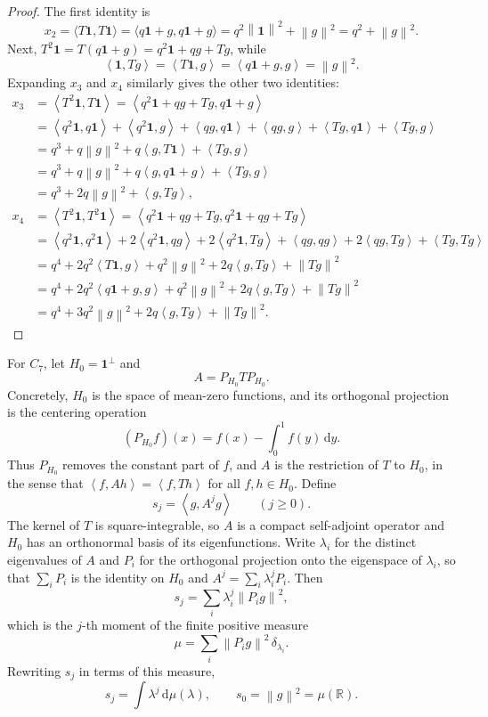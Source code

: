 \documentclass[11pt]{article}
\numberwithin{equation}{section}
\newcommand{\one}{\mathbf 1}
\newcommand{\R}{\mathbb R}
\newcommand{\ip}[2]{\left\langle #1,#2\right\rangle}
\newcommand{\norm}[1]{\left\lVert #1\right\rVert}
\newcommand{\dd}{\,\mathrm d}
\begin{document}
\begin{proof}
  The first identity is 
  \[
    x_2 = \langle T\one, T\one\rangle = \langle q\one + g, q\one + g\rangle = q^2 \norm{\one}^2 + \norm{g}^2 = q^2 + \norm{g}^2.
  \]
  Next,
  $T^2\one=T(q \one + g) = q^2\one + qg + Tg$, while
  \[
    \ip{\one}{Tg}=\ip{T\one}{g}= \ip{q\one + g}{g}=\norm g^2.
  \]
  Expanding $x_3$ and $x_4$ similarly gives the other two identities:
  \begin{align*}
    x_3 &= \ip{T^2\one}{T\one} = \ip{q^2\one + qg + Tg}{q\one + g} \\
    {} &= \ip{q^2\one}{q\one} + \ip{q^2\one}{g} + \ip{qg}{q\one} + \ip{qg}{g} + \ip{Tg}{q\one} + \ip{Tg}{g} \\
    {} &= q^3 + q \norm{g}^2 + q \ip{g}{T \one} + \ip{Tg}{g} \\
    {} &= q^3 + q \norm{g}^2 + q \ip{g}{q \one + g} + \ip{Tg}{g} \\
    {} &= q^3 + 2q \norm{g}^2 + \ip{g}{Tg}, 
    \\ 
    x_4 &= \ip{T^2 \one}{T^2 \one} = \ip{q^2\one + qg + Tg}{q^2\one + qg + Tg} \\
    {} &= \ip{q^2\one}{q^2\one} + 2 \ip{q^2\one}{qg} + 2 \ip{q^2\one}{Tg} + \ip{qg}{qg} + 2 \ip{qg}{Tg} + \ip{Tg}{Tg} \\
    {} &= q^4 + 2q^2 \ip{T \one}{g} + q^2 \norm{g}^2 + 2q \ip{g}{Tg} + \norm{Tg}^2 \\
    {} &= q^4 + 2q^2 \ip{q \one + g}{g} + q^2 \norm{g}^2 + 2q \ip{g}{Tg} + \norm{Tg}^2 \\
    {} &= q^4 + 3q^2 \norm{g}^2 + 2q \ip{g}{Tg} + \norm{Tg}^2.
  \end{align*}
\end{proof}

For $C_7$, let $H_0=\one^\perp$ and
\[
  A=P_{H_0}TP_{H_0}.
\]
Concretely, $H_0$ is the space of mean-zero functions, and its orthogonal
projection is the centering operation
\[
  (P_{H_0}f)(x)=f(x)-\int_0^1f(y)\dd y.
\]
Thus $P_{H_0}$ removes the constant part of $f$, and $A$ is the restriction
of $T$ to $H_0$, in the sense that $\ip f{Ah}=\ip f{Th}$ for all
$f,h\in H_0$.  Define
\begin{equation}\label{eq:sj-def}
  s_j=\ip g{A^jg}\qquad(j\ge0).
\end{equation}
The kernel of $T$ is square-integrable, so $A$ is a compact self-adjoint
operator and $H_0$ has an orthonormal basis of its eigenfunctions.  Write
$\lambda_i$ for the distinct eigenvalues of $A$ and $P_i$ for the orthogonal
projection onto the eigenspace of $\lambda_i$, so that $\sum_iP_i$ is the
identity on $H_0$ and $A^j=\sum_i\lambda_i^jP_i$.  Then
\[
  s_j=\sum_i\lambda_i^j\norm{P_ig}^2,
\]
which is the $j$-th moment of the finite positive measure
\begin{equation}\label{eq:mu-short}
  \mu=\sum_i\norm{P_ig}^2\,\delta_{\lambda_i}.
\end{equation}
Rewriting $s_j$ in terms of this measure,
\begin{equation}\label{eq:sj-moment}
  s_j=\int\lambda^j\dd\mu(\lambda),
  \qquad s_0=\norm g^2=\mu(\R).
\end{equation}
\end{document}
